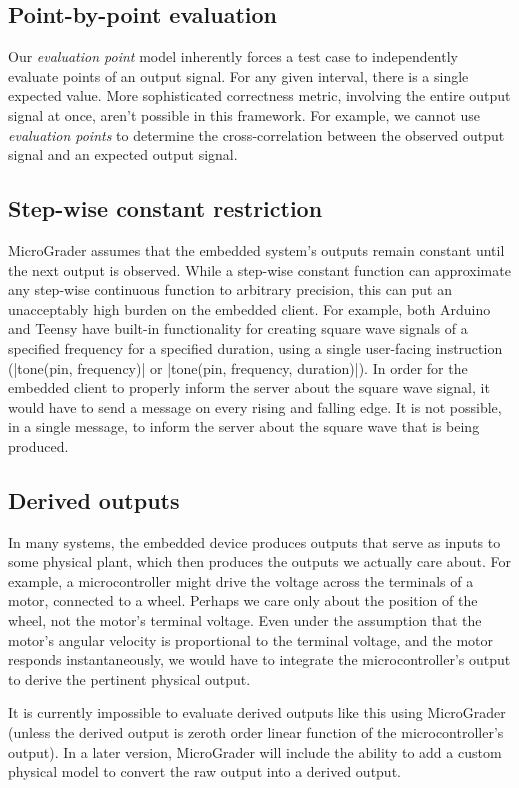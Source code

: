 \documentclass[12pt]{article}
\begin{document}
\subsection{Point-by-point evaluation}
Our \textit{evaluation point} model inherently forces a test case to independently evaluate points of an output signal.  For any given interval, there is a single expected value.   More sophisticated correctness metric, involving the entire output signal at once, aren't possible in this framework.  For example, we cannot use \textit{evaluation points} to determine the cross-correlation between the observed output signal and an expected output signal.

\subsection{Step-wise constant restriction}
MicroGrader assumes that the embedded system's outputs remain constant until the next output is observed.  While a step-wise constant function can approximate any step-wise continuous function to arbitrary precision, this can put an unacceptably high burden on the embedded client.  For example, both Arduino and Teensy have built-in functionality for creating square wave signals of a specified frequency for a specified duration, using a single user-facing instruction (|tone(pin, frequency)| or |tone(pin, frequency, duration)|).  In order for the embedded client to properly inform the server about the square wave signal, it would have to send a message on every rising and falling edge.  It is not possible, in a single message, to inform the server about the square wave that is being produced.

\subsection{Derived outputs}
In many systems, the embedded device produces outputs that serve as inputs to some physical plant, which then produces the outputs we actually care about.  For example, a microcontroller might drive the voltage across the terminals of a motor, connected to a wheel.  Perhaps we care only about the position of the wheel, not the motor's terminal voltage.  Even under the assumption that the motor's angular velocity is proportional to the terminal voltage, and the motor responds instantaneously, we would have to integrate the microcontroller's output to derive the pertinent physical output.

It is currently impossible to evaluate derived outputs like this using MicroGrader (unless the derived output is zeroth order linear function of the microcontroller's output).  In a later version, MicroGrader will include the ability to add a custom physical model to convert the raw output into a derived output.
\end{document}

